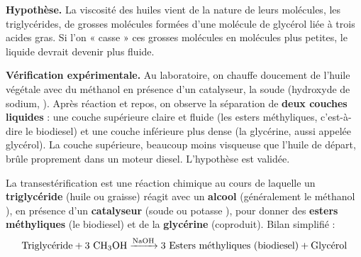 \documentclass[11pt]{article}
\newcommand{\cle}[1]{{\popxbold\color{popdark}#1}}
\begin{document}
\textbf{Hypothèse.} La viscosité des huiles vient de la nature de leurs molécules, les \cle{triglycérides}, de grosses molécules formées d'une molécule de glycérol liée à trois acides gras. Si l'on « casse » ces grosses molécules en molécules plus petites, le liquide devrait devenir plus fluide.

\textbf{Vérification expérimentale.} Au laboratoire, on chauffe doucement de l'huile végétale avec du \cle{méthanol} en présence d'un catalyseur, la \cle{soude} (hydroxyde de sodium, ). Après réaction et repos, on observe la séparation de \textbf{deux couches liquides} : une couche supérieure claire et fluide (les esters méthyliques, c'est-à-dire le biodiesel) et une couche inférieure plus dense (la glycérine, aussi appelée glycérol). La couche supérieure, beaucoup moins visqueuse que l'huile de départ, brûle proprement dans un moteur diesel. L'hypothèse est validée.

\begin{definition}[Transestérification]
La \cle{transestérification} est une réaction chimique au cours de laquelle un \textbf{triglycéride} (huile ou graisse) réagit avec un \textbf{alcool} (généralement le méthanol ), en présence d'un \textbf{catalyseur} (soude  ou potasse ), pour donner des \textbf{esters méthyliques} (le biodiesel) et de la \textbf{glycérine} (coproduit). Bilan simplifié :
\[ \text{Triglycéride} + 3\ \ce{CH3OH} \xrightarrow{\text{NaOH}} 3\ \text{Esters méthyliques (biodiesel)} + \text{Glycérol} \]
\end{definition}
\end{document}

